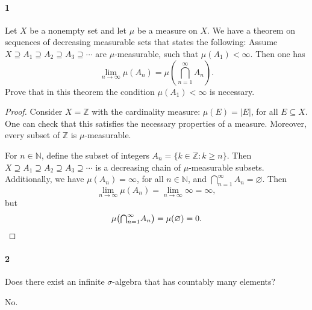 \documentclass[12pt]{article}
\newlength{\myparskip}
\newenvironment{fullbox}{\begin{lrbox}{\savefullbox}\begin{minipage}{\dimexpr\textwidth-2\fboxsep\relax}\setlength{\parskip}{\myparskip}}{\end{minipage}\end{lrbox}\framebox[\textwidth]{\usebox{\savefullbox}}}
\newenvironment{pbox}[1][]{\begin{fullbox}\ifx#1\empty\else\paragraph{#1}\fi}{\end{fullbox}}
\newcommand{\N}{\mathbb{N}}
\newcommand{\Z}{\mathbb{Z}}
\renewcommand{\emptyset}{\varnothing}
\newcommand{\<}{\langle}
\renewcommand{\>}{\rangle}
\theoremstyle{definition}
\newcommand{\tbigcap}{{\textstyle\bigcap}}
\newcommand{\qty}[2][0]{
    \ifnum #1=0 (#2) \fi
    \ifnum #1=1 \big(#2\big) \fi
    \ifnum #1=2 \Big(#2\Big) \fi
    \ifnum #1=3 \bigg(#2\bigg) \fi
    \ifnum #1=4 \Bigg(#2\Bigg) \fi
}
\begin{document}
\thispagestyle{title}

\begin{pbox}[1]
    Let $X$ be a nonempty set and let $\mu$ be a measure on $X$. We have a theorem on sequences of decreasing measurable sets that states the following: Assume $X \supseteq A_1 \supseteq A_2 \supseteq A_3 \supseteq \cdots$ are $\mu$-measurable, such that $\mu(A_1) < \infty$. Then one has
    \[
        \lim_{n\to\infty} \mu(A_n) = \mu(\tbigcap_{n=1}^{\infty} A_n).
    \]
    Prove that in this theorem the condition $\mu(A_1) < \infty$ is necessary.
\end{pbox}

\begin{proof}
    Consider $X = \Z$ with the cardinality measure: $\mu(E) = |E|$, for all $E \subseteq X$. One can check that this satisfies the necessary properties of a measure. Moreover, every subset of $\Z$ is $\mu$-measurable.
    
    For $n \in \N$, define the subset of integers $A_n = \{k \in \Z : k \geq n\}$. Then $X \supseteq A_1 \supseteq A_2 \supseteq A_3 \supseteq \cdots$ is a decreasing chain of $\mu$-measurable subsets. Additionally, we have $\mu(A_n) = \infty$, for all $n \in \N$, and $\bigcap_{n=1}^{\infty} A_n = \emptyset$. Then
    \[
        \lim_{n\to\infty} \mu(A_n) = \lim_{n\to\infty} \infty = \infty,
    \]
    but
    \[
        \mu\qty[1]{\tbigcap_{n=1}^{\infty} A_n} = \mu(\emptyset) = 0.
    \]

\end{proof}


\newpage
\begin{pbox}[2]
    Does there exist an infinite $\sigma$-algebra that has countably many elements?
\end{pbox}

No.
\end{document}
